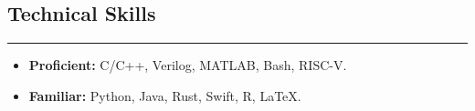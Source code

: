 \documentclass[10pt,letterpaper]{article}
\newcommand{\sectionbreak}
{
	\vspace{-1.2em}
	\rule{\textwidth}{1.7pt}
	\vspace{-1.7em}
}
\begin{document}
\vspace{-1.5em}
\subsection*{Technical Skills}
\sectionbreak

\begin{itemize}

	\item
		\textbf{Proficient:} C/C++, Verilog, MATLAB, Bash, RISC-V. 
	\item
		\textbf{Familiar:} Python, Java, Rust, Swift, R, \LaTeX.
\end{itemize}
\end{document}
